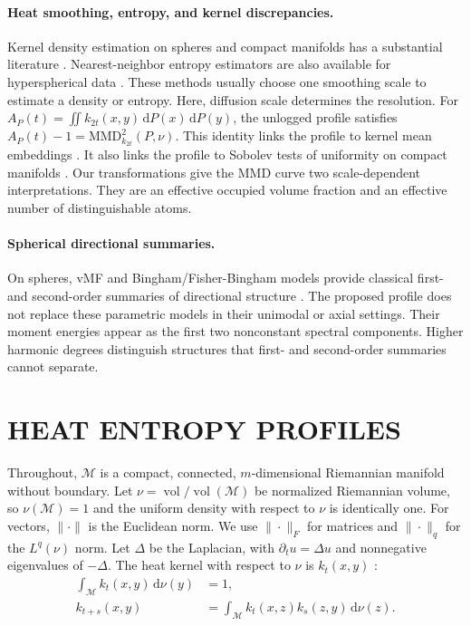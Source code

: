 \documentclass[twoside]{article}
\theoremstyle{definition}
\theoremstyle{remark}
\DeclareMathOperator{\vol}{vol}
\newcommand{\M}{\mathcal{M}}
\newcommand{\dd}{\,\mathrm{d}}
\newcommand{\mmd}{\mathrm{MMD}}
\begin{document}
\paragraph{Heat smoothing, entropy, and kernel discrepancies.}
Kernel density estimation on spheres and compact manifolds has a substantial literature \citep{hall_1987_KernelDensityEstimation, pelletier_2005_KernelDensityEstimation, lebrigant_2019_ApproximationDensitiesRiemannian}. Nearest-neighbor entropy estimators are also available for hyperspherical data \citep{li_2011_KNearestNeighborBased}. These methods usually choose one smoothing scale to estimate a density or entropy. Here, diffusion scale determines the resolution. For \(A_P(t)=\iint k_{2t}(x,y)\dd P(x)\dd P(y)\), the unlogged profile satisfies \(A_P(t)-1=\mmd_{k_{2t}}^2(P,\nu)\). This identity links the profile to kernel mean embeddings \citep{sriperumbudur_2010_HilbertSpaceEmbeddings,gretton_2012_KernelTwoSampleTest, muandet_2017_KernelMeanEmbedding}. It also links the profile to Sobolev tests of uniformity on compact manifolds \citep{gine_1975_InvariantTestsUniformity, garcia-portugues_2018_OverviewUniformityTests}. Our transformations give the MMD curve two scale-dependent interpretations. They are an effective occupied volume fraction and an effective number of distinguishable atoms.

\paragraph{Spherical directional summaries.}
On spheres, vMF and Bingham/Fisher-Bingham models provide
classical first- and second-order summaries of directional structure \citep{kent_1982_FisherBinghamDistributionSphere,mardia_2000_DirectionalStatistics}. The proposed profile does not replace these parametric models in their unimodal or axial settings. Their moment energies appear as the first two nonconstant spectral components. Higher harmonic degrees distinguish structures that first- and second-order summaries cannot separate.


\section{HEAT ENTROPY PROFILES}

Throughout, $\M$ is a compact, connected, $m$-dimensional Riemannian manifold
without boundary. Let $\nu=\vol/\vol(\M)$ be normalized Riemannian volume, so
$\nu(\M)=1$ and the uniform density with respect to $\nu$ is identically one.
For vectors, $\|\cdot\|$ is the Euclidean norm. We use $\|\cdot\|_F$ for matrices and $\|\cdot\|_q$ for the $L^q(\nu)$ norm.
Let $\Delta$ be the Laplacian, with $\partial_t u=\Delta u$ and nonnegative eigenvalues of $-\Delta$. The heat kernel with respect to $\nu$ is $k_t(x,y)$
\citep{rosenberg_1997_LaplacianRiemannianManifold, grigoryan_2009_HeatKernelAnalysis}:
\begin{align*}
  \int_\M k_t(x,y)\dd\nu(y)&=1,\\
  k_{t+s}(x,y)&=\int_\M k_t(x,z)k_s(z,y)\dd\nu(z).
\end{align*}
\end{document}
